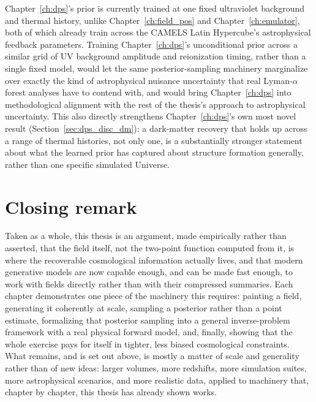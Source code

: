Chapter~\ref{ch:dps}'s prior is currently trained at one fixed ultraviolet background and thermal history, unlike Chapter~\ref{ch:field_pos} and Chapter~\ref{ch:emulator}, both of which already train across the CAMELS Latin Hypercube's astrophysical feedback parameters. Training Chapter~\ref{ch:dps}'s unconditional prior across a similar grid of UV background amplitude and reionization timing, rather than a single fixed model, would let the same posterior-sampling machinery marginalize over exactly the kind of astrophysical nuisance uncertainty that real Lyman-$\alpha$ forest analyses have to contend with, and would bring Chapter~\ref{ch:dps} into methodological alignment with the rest of the thesis's approach to astrophysical uncertainty. This also directly strengthens Chapter~\ref{ch:dps}'s own most novel result (Section~\ref{sec:dps_disc_dm}): a dark-matter recovery that holds up across a range of thermal histories, not only one, is a substantially stronger statement about what the learned prior has captured about structure formation generally, rather than one specific simulated Universe.

\section{Closing remark}
\label{sec:conclusion_closing}

Taken as a whole, this thesis is an argument, made empirically rather than asserted, that the field itself, not the two-point function computed from it, is where the recoverable cosmological information actually lives, and that modern generative models are now capable enough, and can be made fast enough, to work with fields directly rather than with their compressed summaries. Each chapter demonstrates one piece of the machinery this requires: painting a field, generating it coherently at scale, sampling a posterior rather than a point estimate, formalizing that posterior sampling into a general inverse-problem framework with a real physical forward model, and, finally, showing that the whole exercise pays for itself in tighter, less biased cosmological constraints. What remains, and is set out above, is mostly a matter of scale and generality rather than of new ideas: larger volumes, more redshifts, more simulation suites, more astrophysical scenarios, and more realistic data, applied to machinery that, chapter by chapter, this thesis has already shown works.

